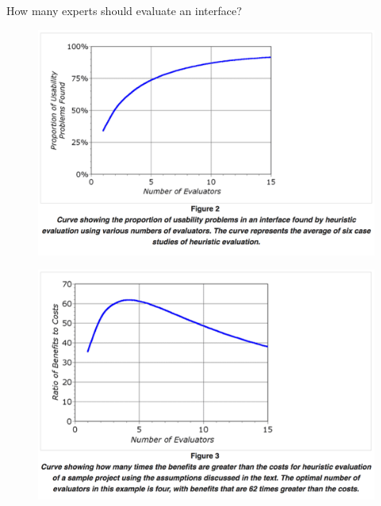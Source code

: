 \begin{frame}

	\huge{How many experts should evaluate an interface?}

\end{frame}

\begin{frame}
	\begin{figure}
		\includegraphics[scale=.4]{assets/num-found}
	\end{figure}
\end{frame}

\begin{frame}
	\begin{figure}
		\includegraphics[scale=.4]{assets/costvsben}
	\end{figure}
\end{frame}

